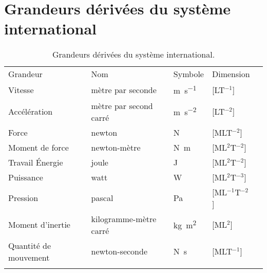 \newpage
\section*{Grandeurs dérivées du système international}

\begin{table}[!h]
    \centering
    \begin{tabular*}{15cm}{M{5.5cm}M{4cm}M{1.5cm}M{2cm}N}
        \hhline{====}
        Grandeur & Nom & Symbole & Dimension \\
        \hhline{----}
        Vitesse               & mètre par seconde      & \si{\meter\per\second}         & [LT$^{-1}$] \\
        Accélération          & mètre par second carré & \si{\meter\per\second\squared} & [LT$^{-2}$] \\ 
        Force                 & newton                 & \si{\newton}                   & [MLT$^{-2}$] \\
        Moment de force       & newton-mètre           & \si{\newton\meter}            & [ML$^2$T$^{-2}$] \\
        Travail \'Energie     & joule                  & \si{\joule}                    & [ML$^2$T$^{-2}$] \\
        Puissance             & watt                   & \si{\watt}                     & [ML$^2$T$^{-3}$] \\
        Pression              & pascal                 & \si{\pascal}                   & [ML$^{-1}$T$^{-2}$] \\
        Moment d'inertie      & kilogramme-mètre carré & \si{\kilogram\meter\squared}  & [ML$^2$] \\
        Quantité de mouvement & newton-seconde         & \si{\newton\second}           & [MLT$^{-1}$] \\
        \hhline{====}

    \end{tabular*}
    \caption{Grandeurs dérivées du système international.}
\end{table}



